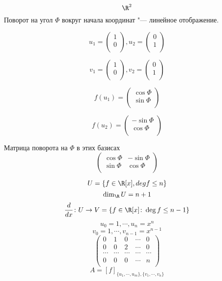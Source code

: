 \begin{exmp}
$$\R^2$$
Поворот на угол $\Phi$ вокруг начала координат "--- линейное отображение.

$$u_1 = 
\begin{pmatrix}
1\\
0\\
\end{pmatrix}, u_2 = 
\begin{pmatrix}
0\\
1\\
\end{pmatrix}$$


$$v_1 = 
\begin{pmatrix}
1\\
0\\
\end{pmatrix}, 
v_2 = 
\begin{pmatrix}
0\\
1\\
\end{pmatrix}$$

$$ 
f(u_1) = 
\begin{pmatrix}
\cos \Phi\\
\sin \Phi\\
\end{pmatrix}
$$

$$ 
f(u_2) = 
\begin{pmatrix}
-\sin \Phi\\
\cos \Phi\\
\end{pmatrix}
$$

Матрица поворота на $\Phi$ в этих базисах 
$$ 
\begin{pmatrix}
\cos \Phi & -\sin \Phi\\
\sin \Phi & \cos \Phi\\
\end{pmatrix}
$$
\end{exmp}
\begin{exmp}
$$U = \{f \in \R[x], deg f \le n\}$$
$$\dim_{\R}U = n + 1$$
$$\frac{d}{dx}\colon U \to V = \{f \in \R[x]\colon \deg f \le n - 1\}$$
$$u_0 = 1, \cdots, u_n = x^n$$
$$v_0 = 1, \cdots, v_{n - 1} = x^{n - 1}$$
$$
\begin{pmatrix}
0&1&0&\cdots&0\\
0&0&2&\cdots&0\\
\cdots&\cdots&\cdots&\cdots&\cdots\\
0&0&0&\cdots&n\\
\end{pmatrix} 
$$
$$A = [f]_{\{u_1, \cdots, u_m\}, \{v_1, \cdots, v_n\}}$$
\end{exmp}

